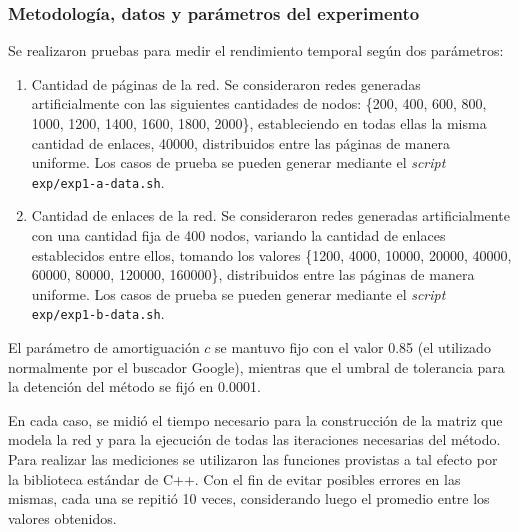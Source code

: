             \subsubsection*{Metodología, datos y parámetros del experimento}
                Se realizaron pruebas para medir el rendimiento temporal según dos parámetros:
                \begin{enumerate}[label=(\alph*)]
                    \item Cantidad de páginas de la red. Se consideraron redes generadas artificialmente con las siguientes cantidades de nodos: \{200, 400, 600, 800, 1000, 1200, 1400, 1600, 1800, 2000\}, estableciendo en todas ellas la misma cantidad de enlaces, 40000, distribuidos entre las páginas de manera uniforme. Los casos de prueba se pueden generar mediante el \emph{script} \texttt{exp/exp1-a-data.sh}.

                    \item Cantidad de enlaces de la red. Se consideraron redes generadas artificialmente con una cantidad fija de 400 nodos, variando la cantidad de enlaces establecidos entre ellos, tomando los valores \{1200, 4000, 10000, 20000, 40000, 60000, 80000, 120000, 160000\}, distribuidos entre las páginas de manera uniforme. Los casos de prueba se pueden generar mediante el \emph{script} \texttt{exp/exp1-b-data.sh}.
                \end{enumerate}

                El parámetro de amortiguación $c$ se mantuvo fijo con el valor 0.85 (el utilizado normalmente por el buscador Google\cite{Brin1998}), mientras que el umbral de tolerancia para la detención del método se fijó en 0.0001.

                En cada caso, se midió el tiempo necesario para la construcción de la matriz que modela la red y para la ejecución de todas las iteraciones necesarias del método. Para realizar las mediciones se utilizaron las funciones provistas a tal efecto por la biblioteca estándar de C++. Con el fin de evitar posibles errores en las mismas, cada una se repitió 10 veces, considerando luego el promedio entre los valores obtenidos.

